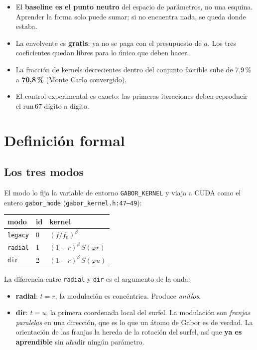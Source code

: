 \documentclass[12pt]{extarticle}
\newcommand{\code}[1]{\texttt{#1}}
\begin{document}
\begin{itemize}
\item El \textbf{baseline es el punto neutro} del espacio de parámetros, no una
      esquina. Aprender la forma solo puede sumar; si no encuentra nada, se
      queda donde estaba.
\item La envolvente es \textbf{gratis}: ya no se paga con el presupuesto de
      $a$. Los tres coeficientes quedan libres para lo único que deben hacer.
\item La fracción de kernels decrecientes dentro del conjunto factible sube de
      7,9\,\% a \textbf{70,8\,\%} (Monte Carlo convergido).
\item El control experimental es exacto: las primeras iteraciones deben
      reproducir el run\,67 dígito a dígito.
\end{itemize}

\section{Definición formal}

\subsection{Los tres modos}

El modo lo fija la variable de entorno \code{GABOR\_KERNEL} y viaja a CUDA
como el entero \code{gabor\_mode} (\code{gabor\_kernel.h:47--49}):

\begin{center}\small
\begin{tabular}{@{}llp{2.5cm}@{}}
\toprule
\textbf{modo} & \textbf{id} & \textbf{kernel} \\
\midrule
\code{legacy} & 0 & $(f/f_0)^\beta$ \\
\code{radial} & 1 & $(1-r)^\beta\,S(\varphi r)$ \\
\code{dir}    & 2 & $(1-r)^\beta\,S(\varphi u)$ \\
\bottomrule
\end{tabular}
\end{center}

La diferencia entre \code{radial} y \code{dir} es el argumento de la onda:

\begin{itemize}
\item \textbf{radial}: $t=r$, la modulación es concéntrica. Produce
      \emph{anillos}.
\item \textbf{dir}: $t=u$, la primera coordenada local del surfel. La
      modulación son \emph{franjas paralelas} en una dirección, que es lo que
      un átomo de Gabor es de verdad. La orientación de las franjas la hereda
      de la rotación del surfel, así que \textbf{ya es aprendible} sin añadir
      ningún parámetro.
\end{itemize}
\end{document}
